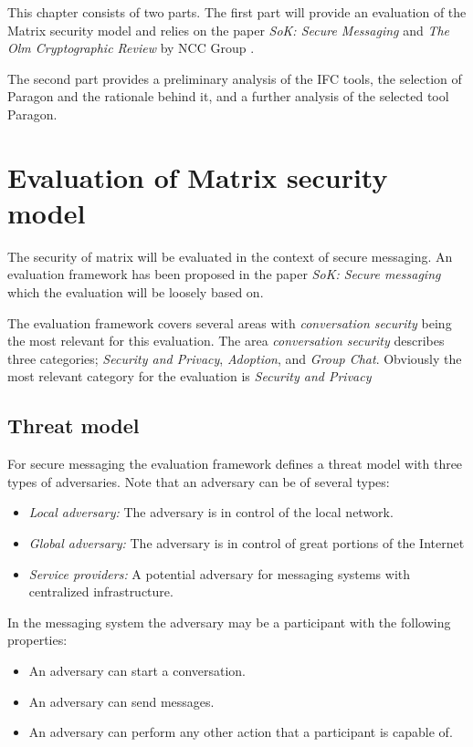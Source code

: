 This chapter consists of two parts. The first part will provide an evaluation of the Matrix security model and relies on the paper \emph{SoK: Secure Messaging} \cite{sok} and \emph{The Olm Cryptographic Review} by NCC Group \cite{ncc}. 

The second part provides a preliminary analysis of the IFC tools, the selection of Paragon and the rationale behind it, and a further analysis of the selected tool Paragon.


\section{Evaluation of Matrix security model}
The security of matrix will be evaluated in the context of secure messaging. An evaluation framework has been proposed in the paper \emph{SoK: Secure messaging} which the evaluation will be loosely based on. 

The evaluation framework covers several areas with \emph{conversation security} being the most relevant for this evaluation. The area \emph{conversation security} describes three categories; \emph{Security and Privacy}, \emph{Adoption}, and \emph{Group Chat}. Obviously the most relevant category for the evaluation is \emph{Security and Privacy}

\subsection{Threat model}
For secure messaging the evaluation framework defines a threat model with three types of adversaries. Note that an adversary can be of several types:

\begin{itemize}
	\item \emph{Local adversary:} The adversary is in control of the local network.
	\item \emph{Global adversary:} The adversary is in control of great portions of the Internet 
	\item \emph{Service providers:} A potential adversary for messaging systems with centralized infrastructure.
\end{itemize}

In the messaging system the adversary may be a participant with the following properties:

\begin{itemize}
	\item An adversary can start a conversation.
	\item An adversary can send messages.
	\item An adversary can perform any other action that a participant is capable of.
\end{itemize}

